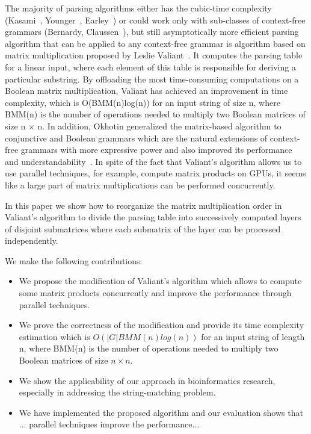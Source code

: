 The majority of parsing algorithms either has the cubic-time complexity (Kasami~\cite{Kas}, Younger~\cite{Younger:1966:CLP:1441427.1442019}, Earley~\cite{Earley:1970:ECP:362007.362035}) or could work only with sub-classes of context-free grammars (Bernardy, Claussen~\cite{Bernardy:2013:EDP:2544174.2500576}), but still asymptotically more efficient parsing algorithm that can be applied to any context-free grammar is algorithm based on matrix multiplication proposed by Leslie Valiant~\cite{Valiant:1975:GCR:1739932.1740048}. It computes the parsing table for a linear input, where each element of this table is responsible for deriving a particular substring. By offloading the most time-consuming computations on a Boolean matrix multiplication, Valiant has achieved an improvement in time complexity, which is O(BMM(n)log(n)) for an input string of size n, where BMM(n) is the number of operations needed to multiply two Boolean matrices of size n $\times$ n. In addition, Okhotin generalized the matrix-based algorithm to conjunctive and Boolean grammars which are the natural extensions of context-free grammars with more expressive power and also improved its performance and understandability~\cite{Okhotin:2014:PMM:2565359.2565379}. In spite of the fact that Valiant's algorithm allows us to use parallel techniques, for example, compute matrix products on GPUs, it seems like a large part of matrix multiplications can be performed concurrently.

In this paper we show how to reorganize the matrix multiplication order in Valiant's algorithm to divide the parsing table into successively computed layers of disjoint submatrices where each submatrix of the layer can be processed independently.

We make the following contributions:
\begin{itemize}
  \item We propose the modification of Valiant's algorithm which allows to compute some matrix products concurrently and improve the performance through parallel techniques.
  \item We prove the correctness of the modification and provide its time complexity estimation which is $O(|G|BMM(n)log(n))$ for an input string of length n, where BMM(n) is the number of operations needed to multiply two Boolean matrices of size $n \times n$.
  \item We show the applicability of our approach in bioinformatics research, especially in addressing the string-matching problem.
  \item We have implemented the proposed algorithm and our evaluation shows that ... parallel techniques improve the performance...
\end{itemize}
